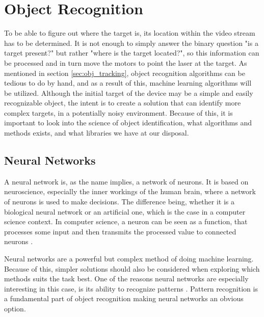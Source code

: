 \section{Object Recognition}
To be able to figure out where the target is, its location within the video stream has to be determined.
It is not enough to simply answer the binary question "is a target present?" but rather "where is the target located?", so this information can be processed and in turn move the motors to point the laser at the target.
As mentioned in section \ref{sec:obj_tracking}, object recognition algorithms can be tedious to do by hand, and as a result of this, machine learning algorithms will be utilized.
Although the initial target of the device may be a simple and easily recognizable object, the intent is to create a solution that can identify more complex targets, in a potentially noisy environment.
Because of this, it is important to look into the science of object identification, what algorithms and methods exists, and what libraries we have at our disposal.

\subsection{Neural Networks}

A neural network is, as the name implies, a network of neurons.
It is based on neuroscience, especially the inner workings of the human brain, where a network of neurons is used to make decisions.
The difference being, whether it is a biological neural network or an artificial one, which is the case in a computer science context.
In computer science, a neuron can be seen as a function, that processes some input and then transmits the processed value to connected neurons \cite{ANN}.

Neural networks are a powerful but complex method of doing machine learning.
Because of this, simpler solutions should also be considered when exploring which methods suits the task best.
One of the reasons neural networks are especially interesting in this case, is its ability to recognize patterns \cite{ANN}.
Pattern recognition is a fundamental part of object recognition making neural networks an obvious option.


